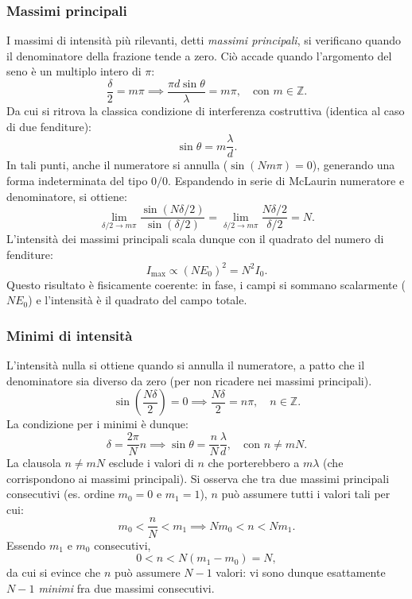 \documentclass[a4paper,11pt]{report}
\begin{document}
\subsubsection{Massimi principali}
I massimi di intensità più rilevanti, detti \textit{massimi principali}, si verificano quando il denominatore della frazione tende a zero. Ciò accade quando l'argomento del seno è un multiplo intero di $\pi$:
\begin{equation}
    \frac{\delta}{2} = m\pi \implies \frac{\pi d \sin\theta}{\lambda} = m\pi, \quad \text{con } m \in \mathbb{Z}.
\end{equation}
Da cui si ritrova la classica condizione di interferenza costruttiva (identica al caso di due fenditure):
\begin{equation}
    \sin\theta = m\frac{\lambda}{d}.
\end{equation}
In tali punti, anche il numeratore si annulla ($\sin(Nm\pi) = 0$), generando una forma indeterminata del tipo $0/0$. Espandendo in serie di McLaurin numeratore e denominatore, si ottiene:
\begin{equation}
    \lim_{\delta/2 \to m\pi} \frac{\sin(N\delta/2)}{\sin(\delta/2)} = \lim_{\delta/2 \to m\pi} \frac{N\delta/2}{\delta/2} = N.
\end{equation}
L'intensità dei massimi principali scala dunque con il quadrato del numero di fenditure:
\begin{equation}
    I_{\text{max}} \propto (N E_0)^2 = N^2 I_0.
\end{equation}
Questo risultato è fisicamente coerente: in fase, i campi si sommano scalarmente ($N E_0$) e l'intensità è il quadrato del campo totale.

\subsubsection{Minimi di intensità}
L'intensità nulla si ottiene quando si annulla il numeratore, a patto che il denominatore sia diverso da zero (per non ricadere nei massimi principali).
\begin{equation}
    \sin\left(\frac{N\delta}{2}\right) = 0 \implies \frac{N\delta}{2} = n\pi, \quad n \in \mathbb{Z}.
\end{equation}
La condizione per i minimi è dunque:
\begin{equation}
    \delta = \frac{2\pi}{N} n \implies \sin\theta = \frac{n}{N}\frac{\lambda}{d}, \quad \text{con } n \neq mN.
\end{equation}
La clausola $n \neq mN$ esclude i valori di $n$ che porterebbero a $m\lambda$ (che corrispondono ai massimi principali).
Si osserva che tra due massimi principali consecutivi (es. ordine $m_0=0$ e $m_1=1$), $n$ può assumere tutti i valori tali per cui:
\begin{equation}
    m_0 < \frac{n}{N} < m_1 \implies Nm_0 < n < Nm_1.
\end{equation}
Essendo $m_1$ e $m_0$ consecutivi, 
\begin{equation}
    0 < n < N(m_1-m_0) = N,
\end{equation}
da cui si evince che $n$ può assumere $N-1$ valori: vi sono dunque esattamente \textit{$N-1$ minimi} fra due massimi consecutivi.
\end{document}
